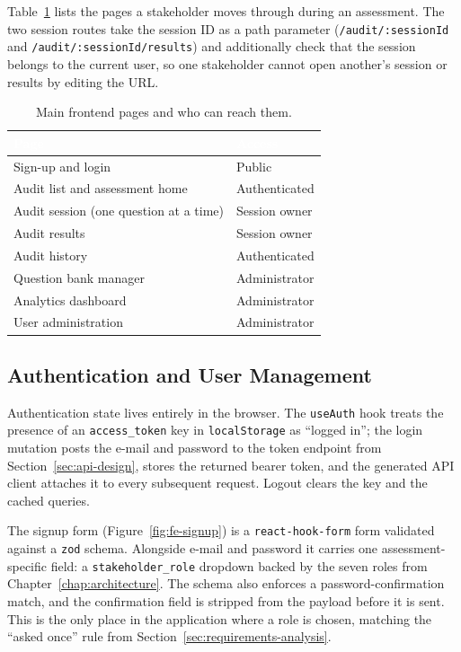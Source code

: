 \documentclass[a4paper, 12pt, oneside, openany, BCOR1cm,toc=chapterentrywithdots]{scrbook}
\newcommand{\thw}[1]{\textcolor{white}{\textbf{#1}}}
\begin{document}
Table~\ref{tab:frontend-routes} lists the pages a stakeholder moves through during an
assessment. The two session routes take the session ID as a path parameter
(\texttt{/audit/:sessionId} and \texttt{/audit/:sessionId/results}) and additionally check that
the session belongs to the current user, so one stakeholder cannot open another's session or
results by editing the URL.

\begin{table}[h]
\centering
{}
\begin{tabular}{l l}
\toprule
\rowcolor{green!55!black}
\thw{Page} & \thw{Access} \\
\midrule
Sign-up and login & Public \\
Audit list and assessment home & Authenticated \\
Audit session (one question at a time) & Session owner \\
Audit results & Session owner \\
Audit history & Authenticated \\
Question bank manager & Administrator \\
Analytics dashboard & Administrator \\
User administration & Administrator \\
\bottomrule
\end{tabular}
\caption{Main frontend pages and who can reach them.}
\label{tab:frontend-routes}
\end{table}

\subsection{Authentication and User Management}

Authentication state lives entirely in the browser. The \texttt{useAuth} hook treats the
presence of an \texttt{access\_token} key in \texttt{localStorage} as ``logged in''; the login
mutation posts the e-mail and password to the token endpoint from
Section~\ref{sec:api-design}, stores the returned bearer token, and the generated API client
attaches it to every subsequent request. Logout clears the key and the cached queries.

The signup form (Figure~\ref{fig:fe-signup}) is a \texttt{react-hook-form} form validated
against a \texttt{zod} schema. Alongside e-mail and password it carries one assessment-specific
field: a \texttt{stakeholder\_role} dropdown backed by the seven roles from
Chapter~\ref{chap:architecture}. The schema also enforces a password-confirmation match, and
the confirmation field is stripped from the payload before it is sent. This is the only place
in the application where a role is chosen, matching the ``asked once'' rule from
Section~\ref{sec:requirements-analysis}.
\end{document}
